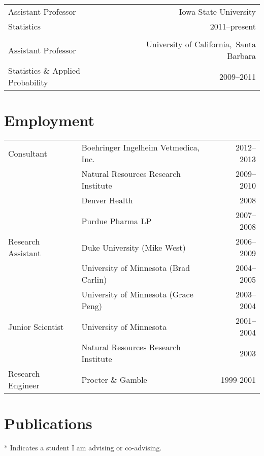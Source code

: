 \documentclass[overlapped,line]{res}
\begin{document}
\begin{resume}
\begin{tabular}{l@{\qquad}r}
Assistant Professor & Iowa State University \\
Statistics & 2011--present \\
\\
Assistant Professor & University of California,\ Santa Barbara \\
Statistics \& Applied Probability & 2009--2011
\end{tabular}


\section{\bf Employment}

\begin{tabular}{l@{\qquad}l@{\qquad}r}
Consultant & Boehringer Ingelheim Vetmedica, Inc. & 2012--2013 \\
 & Natural Resources Research Institute  & 2009--2010 \\
 & Denver Health & 2008 \\
 & Purdue Pharma LP & 2007--2008 \\
Research Assistant & Duke University (Mike West) & 2006--2009 \\
 & University of Minnesota (Brad Carlin) & 2004--2005 \\
 & University of Minnesota (Grace Peng) & 2003--2004 \\
Junior Scientist & University of Minnesota & 2001--2004 \\
 & Natural Resources Research Institute & 2003 \\
Research Engineer & Procter \& Gamble & 1999-2001
\end{tabular}


\section{Publications}

* Indicates a student I am advising or co-advising.

\vspace{-0.3in}


\end{resume}
\end{document}
